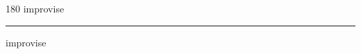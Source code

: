 
\begin{frame}
\begin{center}
\begin{turn}{180}
{\fontsize{2.5cm}{1em}\selectfont improvise}
\end{turn}
\vspace{1em}\par  
\hrule
\vspace{1em}\par  
{\fontsize{2.5cm}{1em}\selectfont improvise}
\end{center}
\end{frame}
